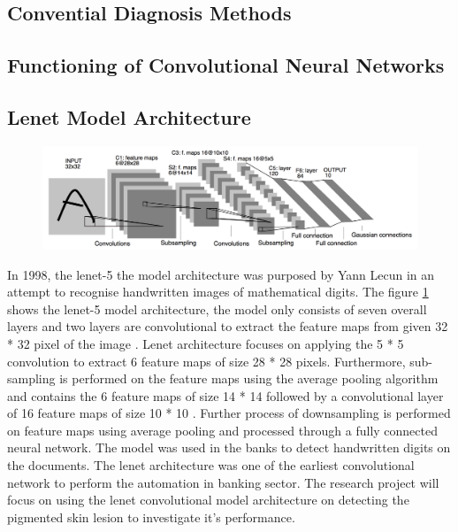 \subsection{Convential Diagnosis Methods}


\subsection{Functioning of Convolutional Neural Networks}


\subsection{Lenet Model Architecture}
\begin{figure}[!htp]
    \centering
    \includegraphics[width=\textwidth]{Images/lenet.png}
    \label{figure:lenetarc}
\end{figure}
In 1998, the lenet-5 the model architecture was purposed by Yann Lecun in an attempt to recognise handwritten images of mathematical digits.
The figure \ref{figure:lenetarc} shows the lenet-5 model architecture, the model only consists of seven overall layers and two layers are convolutional to extract the feature maps from given 32 * 32 pixel of the image \citep{lecun1998gradient}. 
Lenet architecture focuses on applying the 5 * 5 convolution to extract 6 feature maps of size 28 * 28 pixels. Furthermore, sub-sampling is performed on the feature maps using the average pooling algorithm and contains the 6 feature maps of size 14 * 14 followed by a convolutional layer of 16 feature maps of size 10 * 10 \citep{lecun1998gradient}. 
Further process of downsampling is performed on feature maps using average pooling and processed through a fully connected neural network. 
The model was used in the banks to detect handwritten digits on the documents. 
The lenet architecture was one of the earliest convolutional network to perform the automation in banking 
sector. The research project will focus on using the lenet convolutional model architecture on detecting 
the pigmented skin lesion to investigate it's performance.



